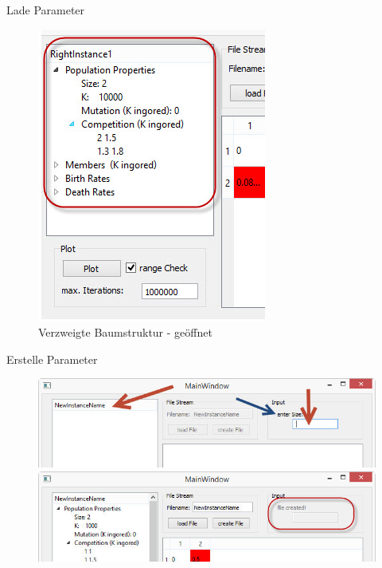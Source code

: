 \documentclass{beamer}
\begin{document}
\begin{frame}{Lade Parameter}
\begin{minipage}{0.45\textwidth}
\begin{figure}[H]
			\includegraphics[width=1\linewidth]{./Pictures/MainWindow_ParameterBaum_offen}
			\caption[MainWindow_Parameter]{Verzweigte Baumstruktur - geöffnet}
			\label{Baumstruktur_offen}
		\end{figure}
	\end{minipage}
\end{frame}
\begin{frame}{Erstelle Parameter}
	\begin{figure}[H]
		\centering
		\includegraphics[width=1\linewidth]{./Pictures/MainWindow_createFile}\bigskip\\
		\includegraphics[width=1\linewidth]{./Pictures/MainWindow_FileCreated}
	\end{figure}
\end{frame}
\end{document}
